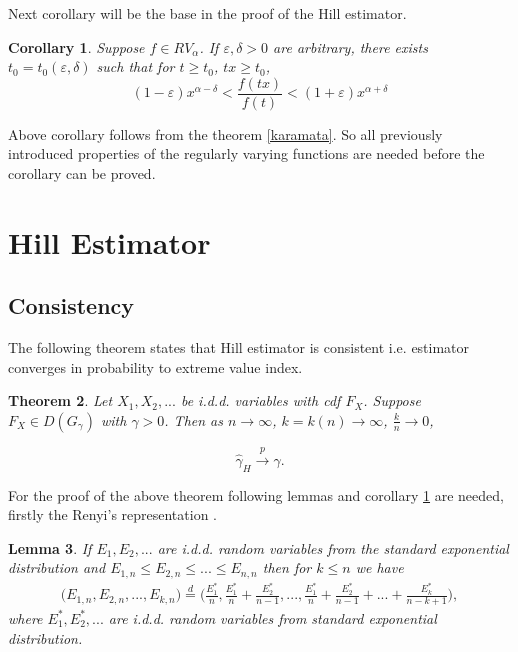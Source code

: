 \documentclass[english,12pt,a4paper,pdftex,sci,utf8]{aaltothesis} %
\newtheorem{theorem}{Theorem}[section]
\newtheorem{corollary}[theorem]{Corollary}
\newtheorem{lemma}[theorem]{Lemma}
\begin{document}
Next corollary will be the base in the proof of the Hill estimator. 

\begin{corollary}
Suppose $f \in RV_{\alpha}$. If $\varepsilon, \delta>0$ are arbitrary, there exists $t_0=t_0(\varepsilon, \delta)$ such that for $t\geq t_0$, $tx \geq t_0$,
\begin{equation*}
(1-\varepsilon)x^{\alpha-\delta}<\frac{f(tx)}{f(t)}<(1+\varepsilon)x^{\alpha+\delta}
\end{equation*}
\label{inequality}
\end{corollary}

Above corollary follows from the theorem \ref{karamata}. So all previously introduced properties of the regularly varying functions are needed before the corollary \label{inequality} can be proved. 






\clearpage

\section{Hill Estimator}
\label{hillEst}
\subsection{Consistency}

The following theorem states that Hill estimator is consistent i.e. estimator converges in probability to extreme value index. \cite{hill}


\begin{theorem}
Let $X_1, X_2,...$ be i.d.d. variables with cdf $F_X$. Suppose $F_X \in D(G_{\gamma})$ with $\gamma > 0$. Then as $n \rightarrow \infty$, $k=k(n)  \rightarrow \infty$, $\frac{k}{n} \rightarrow 0$,

\begin{equation*}
\hat{\gamma}_H \xrightarrow{p} \gamma.
\end{equation*}
\label{hillcons}
\end{theorem}

For the proof of the above theorem following lemmas and corollary \ref{inequality} are needed, firstly the Renyi's representation \cite{renyi}.
\begin{lemma}
If $E_1, E_2,...$ are i.d.d. random variables from the standard exponential distribution and $E_{1,n} \leq E_{2,n} \leq ... \leq E_{n,n}$ then for $k \leq n$ we have
\begin{multline*}
\big(E_{1,n}, E_{2,n}, ... , E_{k,n}\big) 
\overset{d}{=} \Big(\frac{E_1^*}{n}, \frac{E_1^*}{n}+\frac{E_2^*}{n-1}, ... , \frac{E_1^*}{n}+\frac{E_2^*}{n-1}+...+ \frac{E_k^*}{n-k+1}\Big),
\end{multline*}
where $E_1^*,E_2^*,...$ are i.d.d. random variables from standard exponential distribution.
\label{renrep}
\end{lemma}
\end{document}
